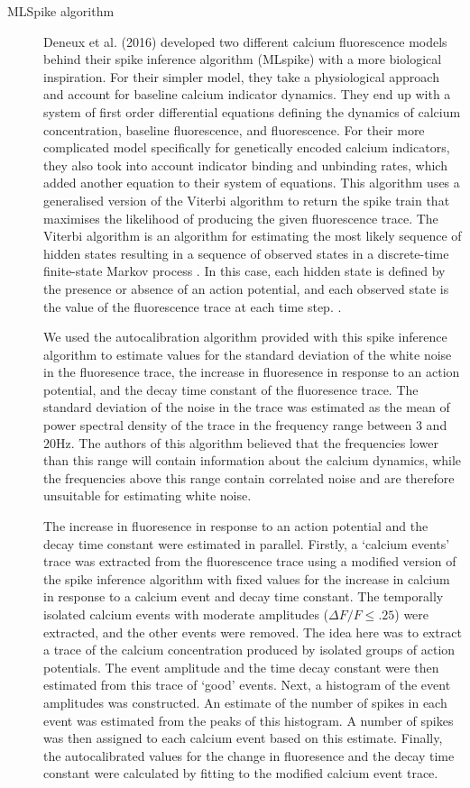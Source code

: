 \begin{description}
    \item[MLSpike algorithm] Deneux et al. (2016) developed two different calcium fluorescence models behind their spike inference algorithm (MLspike) with a more biological inspiration. For their simpler model, they take a physiological approach and account for baseline calcium indicator dynamics. They end up with a system of first order differential equations defining the dynamics of calcium concentration, baseline fluorescence, and fluorescence. For their more complicated model specifically for genetically encoded calcium indicators, they also took into account indicator binding and unbinding rates, which added another equation to their system of equations. This algorithm uses a generalised version of the Viterbi algorithm to return the spike train that maximises the likelihood of producing the given fluorescence trace. The Viterbi algorithm is an algorithm for estimating the most likely sequence of hidden states resulting in a sequence of observed states in a discrete-time finite-state Markov process  \parencite{forney}. In this case, each hidden state is defined by the presence or absence of an action potential, and each observed state is the value of the fluorescence trace at each time step. \parencite{deneux}.

    We used the autocalibration algorithm provided with this spike inference algorithm to estimate values for the standard deviation of the white noise in the fluoresence trace, the increase in fluoresence in response to an action potential, and the decay time constant of the fluoresence trace. The standard deviation of the noise in the trace was estimated as the mean of power spectral density of the trace in the frequency range between $3$ and $20$Hz. The authors of this algorithm believed that the frequencies lower than this range will contain information about the calcium dynamics, while the frequencies above this range contain correlated noise and are therefore unsuitable for estimating white noise.

    The increase in fluoresence in response to an action potential and the decay time constant were estimated in parallel. Firstly, a `calcium events' trace was extracted from the fluorescence trace using a modified version of the spike inference algorithm with fixed values for the increase in calcium in response to a calcium event and decay time constant. The temporally isolated calcium events with moderate amplitudes ($\Delta F/F \leq .25$) were extracted, and the other events were removed. The idea here was to extract a trace of the calcium concentration produced by isolated groups of action potentials. The event amplitude and the time decay constant were then estimated from this trace of `good' events. Next, a histogram of the event amplitudes was constructed. An estimate of the number of spikes in each event was estimated from the peaks of this histogram. A number of spikes was then assigned to each calcium event based on this estimate. Finally, the autocalibrated values for the change in fluoresence and the decay time constant were calculated by fitting to the modified calcium event trace.


\end{description}
